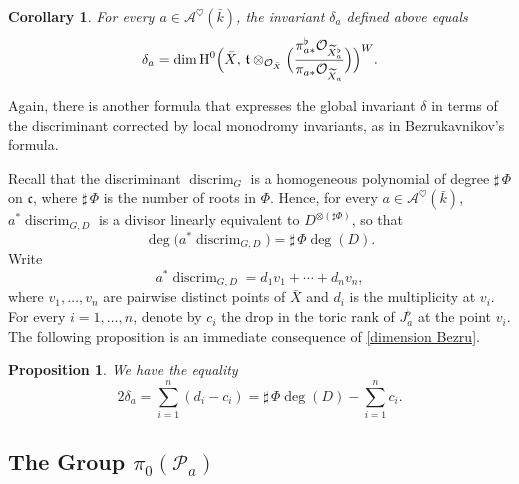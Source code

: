 \documentclass[12pt,english]{smfart}
\numberwithin{equation}{subsection}
\newtheorem{proposition}[equation]{Proposition}
\newtheorem{corollary}[equation]{Corollary}
\theoremstyle{remark}
\begin{document}
\begin{corollary}\label{delta global}
For every $a\in\mathcal{A}^\heartsuit(\bar{k})$, the invariant $\delta_a$ defined above equals
$$
\delta_a=\dim\operatorname{H}^0\Bigl(\bar{X},\,\mathfrak{t}\otimes_{\mathcal{O}_{\bar{X}}}\Bigl(\frac{\pi_{a*}^\flat \mathcal{O}_{\widetilde{X}_a^\flat}}{\pi_{a*}\mathcal{O}_{\widetilde{X}_a}}\Bigr)\Bigr)^W.
$$
\end{corollary}

Again, there is another formula that expresses the global invariant $\delta$ in terms of the discriminant corrected by local monodromy invariants, as in Bezrukavnikov's formula.

Recall that the discriminant $\operatorname{discrim}_G$ is a homogeneous polynomial of degree $\sharp\,\Phi$ on $\mathfrak{c}$, where $\sharp\,\Phi$ is the number of roots in $\Phi$. Hence, for every $a\in\mathcal{A}^\heartsuit(\bar{k})$, $a^*\operatorname{discrim}_{G,D}$ is a divisor linearly equivalent to $D^{\otimes (\sharp\Phi)}$, so that
$$
\deg\bigl(a^*\operatorname{discrim}_{G,D}\bigr)=\sharp\,\Phi\deg(D).
$$
Write
$$
a^*\operatorname{discrim}_{G,D}=d_1v_1+\cdots+d_nv_n,
$$
where $v_1,\ldots,v_n$ are pairwise distinct points of $\bar X$ and $d_i$ is the multiplicity at $v_i$.
For every $i=1,\ldots,n$, denote by $c_i$ the drop in the toric rank of $J_a^\flat$ at the point $v_i$.
The following proposition is an immediate consequence of \ref{dimension Bezru}.

\begin{proposition}\label{dimension Bezru globale}
We have the equality
$$
2\delta_a=\sum_{i=1}^n (d_i-c_i)=\sharp\,\Phi\deg(D)-\sum_{i=1}^n c_i.
$$
\end{proposition}

\subsection{The Group $\pi_0(\mathcal{P}_a)$}\label{subsection : pi_0(P_a)}
\end{document}
